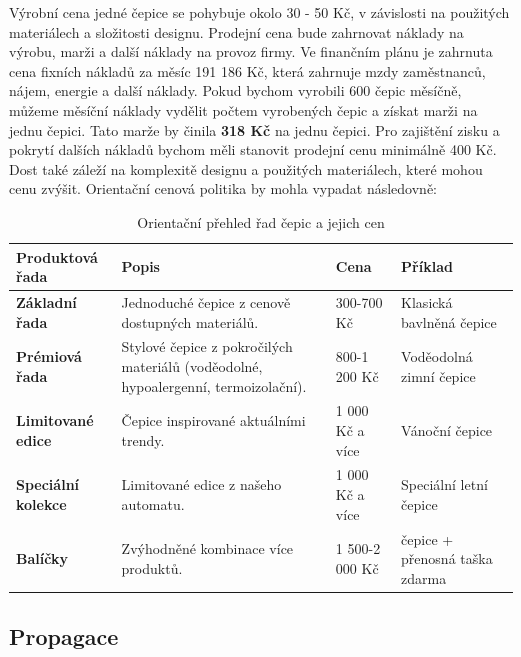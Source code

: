 \documentclass[12pt, a4paper]{article}
\begin{document}
\vspace{10pt}

\noindent Výrobní cena jedné čepice se pohybuje okolo 30 - 50 Kč, v závislosti na použitých materiálech a složitosti designu.
Prodejní cena bude zahrnovat náklady na výrobu, marži a další náklady na provoz firmy.
Ve finančním plánu je zahrnuta cena fixních nákladů za měsíc 191 186 Kč, která zahrnuje mzdy zaměstnanců, nájem, energie a další náklady.
Pokud bychom vyrobili 600 čepic měsíčně, můžeme měsíční náklady vydělit počtem vyrobených čepic a získat marži na jednu čepici.
Tato marže by činila \textbf{318 Kč} na jednu čepici. Pro zajištění zisku a pokrytí dalších nákladů bychom měli stanovit prodejní cenu minimálně 400 Kč.
Dost také záleží na komplexitě designu a použitých materiálech, které mohou cenu zvýšit.
Orientační cenová politika by mohla vypadat následovně:

\renewcommand{\arraystretch}{1.2}

\begin{table}[h]
  \centering
  \begin{tabularx}{\textwidth}{ |>{\raggedright\arraybackslash}X||>{\raggedright\arraybackslash}X|X|>{\raggedright\arraybackslash}X| }
    \hline
    \textbf{Produktová řada} & \textbf{Popis} & \textbf{Cena} & \textbf{Příklad} \\
    \hline
    \hline
    \textbf{Základní řada} 
    & Jednoduché čepice z cenově dostupných materiálů. 
    & 300-700 Kč 
    & Klasická bavlněná čepice \\
    \hline
    \textbf{Prémiová řada} 
    & Stylové čepice z pokročilých materiálů (voděodolné, hypoalergenní, termoizolační). 
    & 800-1 200 Kč 
    & Voděodolná zimní čepice \\
    \hline
    \textbf{Limitované edice} 
    & Čepice inspirované aktuálními trendy. 
    & 1 000 Kč a více 
    & Vánoční čepice \\
    \hline
    \textbf{Speciální kolekce} 
    & Limitované edice z našeho automatu. 
    & 1 000 Kč a více 
    & Speciální letní čepice \\
    \hline
    \textbf{Balíčky} 
    & Zvýhodněné kombinace více produktů. 
    & 1 500-2 000 Kč 
    & 2 čepice + přenosná taška zdarma \\
    \hline
  \end{tabularx}
  \caption{Orientační přehled řad čepic a jejich cen}
\end{table}

\pagebreak

\subsection{Propagace}
\end{document}
